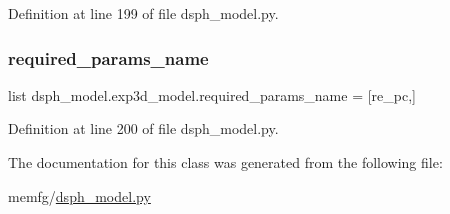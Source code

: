 Definition at line 199 of file dsph\+\_\+model.\+py.

\mbox{\label{classdsph__model_1_1exp3d__model_ac16452f520447380ccd798b53538aed1}} 
\subsubsection{\texorpdfstring{required\+\_\+params\+\_\+name}{required\_params\_name}}
{\footnotesize\ttfamily list dsph\+\_\+model.\+exp3d\+\_\+model.\+required\+\_\+params\+\_\+name = \mbox{[}\textquotesingle{}re\+\_\+pc\textquotesingle{},\mbox{]}\hspace{0.3cm}{\ttfamily [static]}}



Definition at line 200 of file dsph\+\_\+model.\+py.



The documentation for this class was generated from the following file\+:\begin{DoxyCompactItemize}
\item 
memfg/\hyperlink{dsph__model_8py}{dsph\+\_\+model.\+py}\end{DoxyCompactItemize}
